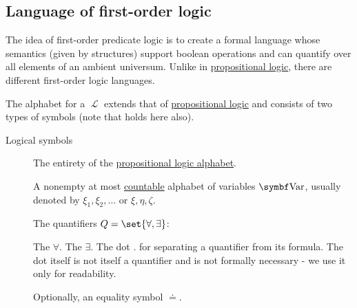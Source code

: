 \subsection{Language of first-order logic}\label{subsec:language_of_first_order_logic}

\begin{definition}\label{def:first_order_language}\mcite\cite[187]{OpenLogic20201202}
  The idea of first-order predicate logic is to create a formal language whose semantics (given by structures) support boolean operations and can quantify over all elements of an ambient universum. Unlike in \hyperref[subsec:language_of_propositional_logic]{propositional logic}, there are different first-order logic languages.

  The alphabet for a  \( \mscrL \) extends that of \hyperref[subsec:language_of_propositional_logic]{propositional logic} and consists of two types of symbols (note that  holds here also).

  \begin{description}
    \item[Logical symbols]
    \hfill
    \begin{defenum}[series=def:first_order_language]
       The entirety of the \hyperref[subsec:language_of_propositional_logic]{propositional logic alphabet}.

       A nonempty at most \hyperref[rem:cardinals/countable]{countable} alphabet of variables \( \bfop{Var} \), usually denoted by \( \xi_1, \xi_2, \ldots \) or \( \xi, \eta, \zeta \).

       The quantifiers \( Q = \set{ \forall, \exists } \):
      \begin{defenum}
         The  \( \forall \).
         The  \( \exists \).
         The dot \( . \) for separating a quantifier from its formula. The dot itself is not itself a quantifier and is not formally necessary - we use it only for readability.
      \end{defenum}

       Optionally, an equality symbol \( \doteq \).
    \end{defenum}


\end{description}
\end{definition}
